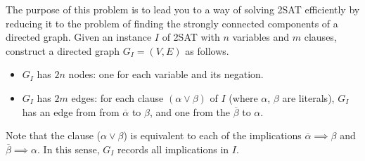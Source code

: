 \documentclass[11pt]{article}
\begin{document}
The purpose of this problem is to lead you to a way of solving 2SAT efficiently by reducing it to
the problem of finding the strongly connected components of a directed graph. Given an instance
$I$ of 2SAT with $n$ variables and $m$ clauses, construct a directed graph $G_I = (V, E)$ as follows.
\begin{itemize}
\item $G_I$ has $2n$ nodes: one for each variable and its negation.
\item $G_I$ has $2m$ edges: for each clause $(\alpha \vee \beta)$ of $I$ (where $\alpha$, $\beta$ are literals), $G_I$ has an edge from
from $\overline{\alpha}$ to $\beta$, and one from the $\overline{\beta}$ to $\alpha$.
\end{itemize}
Note that the clause ($\alpha \vee \beta$) is equivalent to each of the implications $\overline{\alpha} \implies \beta$ and $\overline{\beta} \implies \alpha$. In this sense, $G_I$ records all implications in $I$.
\end{document}
